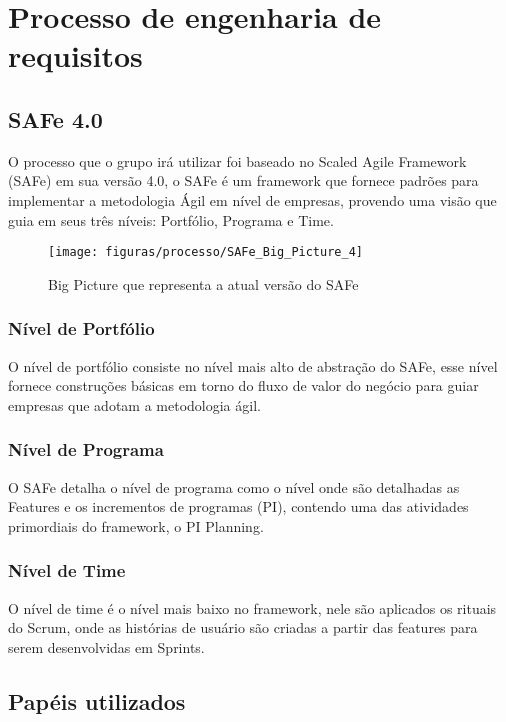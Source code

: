 \chapter{Processo de engenharia de requisitos}

\section{SAFe 4.0}

O processo que o grupo irá utilizar foi baseado no Scaled Agile Framework (SAFe) em sua versão 4.0, o SAFe é um framework que fornece padrões para implementar a metodologia Ágil em nível de empresas, provendo uma visão que guia em seus três níveis: Portfólio, Programa e Time.

\begin{figure}[!htpb]
\centering
\texttt{[image: figuras/processo/SAFe\_Big\_Picture\_4]}
\caption{Big Picture que representa a atual versão do SAFe}
\end{figure}

\subsection{Nível de Portfólio}
O nível de portfólio consiste no nível mais alto de abstração do SAFe, esse nível fornece construções básicas em torno do fluxo de valor do negócio para guiar empresas que adotam a metodologia ágil.

\subsection{Nível de Programa}
O SAFe detalha o nível de programa como o nível onde são detalhadas as Features e os incrementos de programas (PI), contendo uma das atividades primordiais do framework, o PI Planning.

\subsection{Nível de Time}

O nível de time é o nível mais baixo no framework, nele são aplicados os rituais do Scrum, onde as histórias de usuário são criadas a partir das features para serem desenvolvidas em Sprints.

\section{Papéis utilizados}

